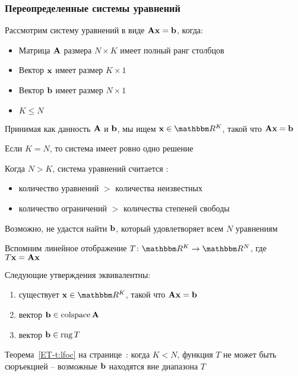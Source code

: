 \begin{frame}\frametitle{Переопределенные системы уравнений}
    
    \vspace{2em}
    Рассмотрим систему уравнений в виде $\mathbf A {\mathbf x} = {\mathbf b}$, когда:
    \begin{itemize}
        \item Матрица $\mathbf A$ размера
        $N \times K$ имеет полный ранг столбцов
        \item Вектор ${\mathbf x}$ имеет размер $K\times1$
        \item Вектор ${\mathbf b}$ имеет размер $N\times 1$ 
        \item $K\leq N$
    \end{itemize} 
    
    \vspace{1em}
    Принимая как данность $\mathbf A$ и ${\mathbf b}$, мы ищем $\boldx \in \RR^K$, такой что
    $\mathbf A {\mathbf x} = {\mathbf b}$

\end{frame}

\begin{frame}

     \vspace{2em}
    Если $K = N$, то система имеет ровно одно решение
    
    \vspace{1em}
    Когда $N > K$, система уравнений считается :
    \begin{itemize}
        \item количество уравнений $>$ количества неизвестных
        \item количество ограничений $>$ количества степеней свободы
    \end{itemize}
    
    Возможно, не удастся найти ${\mathbf b}$, который удовлетворяет всем $N$ уравнениям
    
\end{frame}

\begin{frame}

     \vspace{2em}
    Вспомним линейное отображение $T \colon
    \RR^K \to \RR^N$, где $T{\mathbf x} = \mathbf A {\mathbf x}$
    
    \vspace{1em}
    Следующие утверждения эквивалентны:
    \begin{enumerate}
        \item существует $\boldx \in \RR^K$, такой что $\mathbf A {\mathbf x} = {\mathbf b}$
        \item вектор ${\mathbf b} \in \operatorname{colspace} \mathbf A$
        \item вектор ${\mathbf b} \in \operatorname{rng} T$
    \end{enumerate}
    
     \vspace{.7em}
    Теорема~\ref{ET-t:lfoc} на странице~\pageref{ET-t:lfoc}: когда $K <
    N$, функция $T$ не может быть сюръекцией -- возможные ${\mathbf b}$ находятся
    вне диапазона $T$
    
\end{frame}

